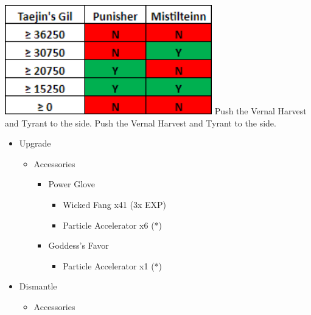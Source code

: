 \begin{paracol}{2}
\begingroup
\includegraphics[width=9cm]{./Chapters/gil_pickups.png}
\endgroup
\switchcolumn
\switchcolumn*
{}
Push the Vernal Harvest and Tyrant to the side.
\switchcolumn
{}
Push the Vernal Harvest and Tyrant to the side.
\switchcolumn*
\begin{upgrade}
	\begin{itemize}
		\item Upgrade
		      \begin{itemize}
			      \item Accessories
			            \begin{itemize}
				            \item Power Glove
				                  \begin{itemize}
					                  \item Wicked Fang x41 (3x EXP)
					                  \item Particle Accelerator x6 (*)
				                  \end{itemize}
				            \item Goddess's Favor
				                  \begin{itemize}
					                  \item Particle Accelerator x1 (*)
				                  \end{itemize}
			            \end{itemize}
		      \end{itemize}
		\item Dismantle
		      \begin{itemize}
			      \item Accessories

\end{itemize}
\end{itemize}
\end{upgrade}
\end{paracol}

